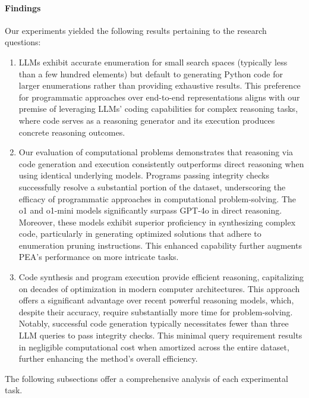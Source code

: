 \paragraph{Findings}
Our
experiments yielded
the following results pertaining to the research questions:
\begin{enumerate}[parsep=0pt,itemsep=1pt,leftmargin=28pt,start=1,label={\bfseries RQ\arabic*:}]
\item LLMs exhibit accurate enumeration for small search spaces (typically less than a few hundred elements) but default to generating Python code for larger enumerations rather than providing exhaustive results. This preference for programmatic approaches over end-to-end representations aligns with our premise of leveraging LLMs' coding capabilities for complex reasoning tasks, where code serves as a reasoning generator and its execution produces concrete reasoning outcomes.

\item Our evaluation of computational problems demonstrates that reasoning via code generation and execution consistently outperforms direct reasoning when using identical underlying models. Programs passing integrity checks successfully resolve a substantial portion of the dataset, underscoring the efficacy of programmatic approaches in computational problem-solving. The o1 and o1-mini models significantly surpass GPT-4o in direct reasoning. Moreover, these models exhibit superior proficiency in synthesizing complex code, particularly in generating optimized solutions that adhere to enumeration pruning instructions. This enhanced capability further augments PEA's performance on more intricate tasks.

\item Code synthesis and program execution provide efficient reasoning, capitalizing on decades of optimization in modern computer architectures. This approach offers a significant advantage over recent powerful reasoning models, which, despite their accuracy, require substantially more time for problem-solving. Notably, successful code generation typically necessitates fewer than three LLM queries to pass integrity checks. This minimal query requirement results in negligible computational cost when amortized across the entire dataset, further enhancing the method's overall efficiency.
\end{enumerate}

The following subsections offer a comprehensive analysis of each experimental
task.

